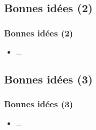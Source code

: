 \documentclass[slidetop,11pt]{beamer}
\begin{document}
\subsection{Bonnes id{\'e}es (2)}
\begin{frame}
	\frametitle{Bonnes id{\'e}es (2)}
	\begin{itemize}
		\item ... 
	\end{itemize} 
\end{frame}

\subsection{Bonnes id{\'e}es (3)}
\begin{frame}
	\frametitle{Bonnes id{\'e}es (3)}
	\begin{itemize}
		\item ... 
	\end{itemize} 
\end{frame}

\end{document}
